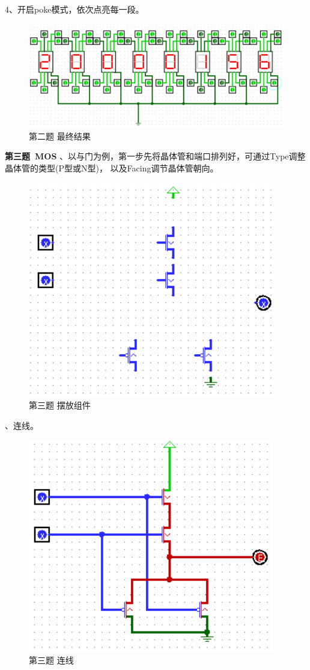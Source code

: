 \documentclass[UTF8]{ctexart}
\begin{document}
4、开启poke模式，依次点亮每一段。
\begin{figure}[h!]
    \centering
    \includegraphics[scale=0.6]{p2.PNG}
    \caption{第二题 最终结果}
\end{figure}
\newline
\textbf{第三题\ MOS}
、以与门为例，第一步先将晶体管和端口排列好，可通过Type调整晶体管的类型(P型或N型)，
以及Facing调节晶体管朝向。
\begin{figure}[h!]
    \centering
    \includegraphics[scale=0.6]{p3_s1.PNG}
    \caption{第三题 摆放组件}
\end{figure}
、连线。
\begin{figure}[h!]
    \centering
    \includegraphics[scale=0.6]{p3_s2.PNG}
    \caption{第三题 连线}
\end{figure}
\end{document}
